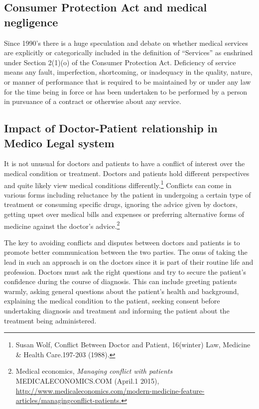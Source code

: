 \begin{multicols}{2}
\subsection*{Consumer Protection Act and medical negligence}

\noi
Since 1990’s there is a huge speculation and debate on whether medical services are
explicitly or categorically included in the definition of “Services” as enshrined under
Section 2(1)(o) of the Consumer Protection Act. Deficiency of service means any fault,
imperfection, shortcoming, or inadequacy in the quality, nature, or manner of
performance that is required to be maintained by or under any law for the time being in
force or has been undertaken to be performed by a person in pursuance of a contract or
otherwise about any service.

\subsection*{Impact of Doctor-Patient relationship in Medico Legal system}

\noi
It is not unusual for doctors and patients to have a conflict of interest over the medical condition or treatment. Doctors and patients hold different perspectives and quite likely view medical conditions differently.\footnote{Susan Wolf, Conflict Between Doctor and Patient, 16(winter) Law, Medicine \& Health Care.197-203 (1988).} Conflicts can come in various forms including reluctance by the patient in undergoing a certain type of treatment or consuming specific drugs, ignoring the advice given by doctors, getting upset over medical bills and expenses or preferring alternative forms of medicine against the doctor’s advice.\footnote{Medical economics, \textit{Managing conflict with patients} MEDICALECONOMICS.COM (April.1 2015), \url{http://www.medicaleconomics.com/modern-medicine-feature-articles/managingconflict-patients.}}

\noi
The key to avoiding conflicts and disputes between doctors and patients is to promote
better communication between the two parties. The onus of taking the lead in such an
approach is on the doctors since it is part of their routine life and profession. Doctors
must ask the right questions and try to secure the patient’s confidence during the course
of diagnosis. This can include greeting patients warmly, asking general questions about
the patient’s health and background, explaining the medical condition to the patient,
seeking consent before undertaking diagnosis and treatment and informing the patient
about the treatment being administered.


\end{multicols}
